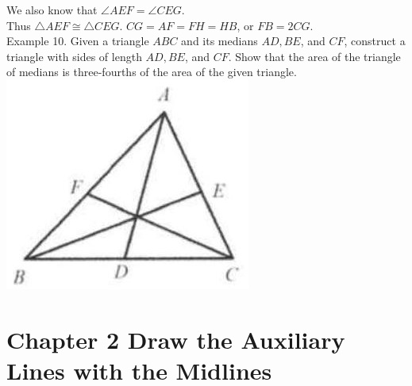 \documentclass[10pt]{article}
\begin{document}
We also know that \(\angle A E F=\angle C E G\).\\
Thus \(\triangle A E F \cong \triangle C E G\). \(C G=A F=F H=H B\), or \(F B=2 C G\).\\
Example 10. Given a triangle \(A B C\) and its medians \(A D, B E\), and \(C F\), construct a triangle with sides of length \(A D, B E\), and \(C F\). Show that the area of the triangle of medians is three-fourths of the area of the given triangle.\\
\includegraphics[max width=\textwidth, center]{2025_04_17_97bc1f7e44d93c271a88g-040(2)}

\section*{Chapter 2 Draw the Auxiliary Lines with the Midlines}
\end{document}
